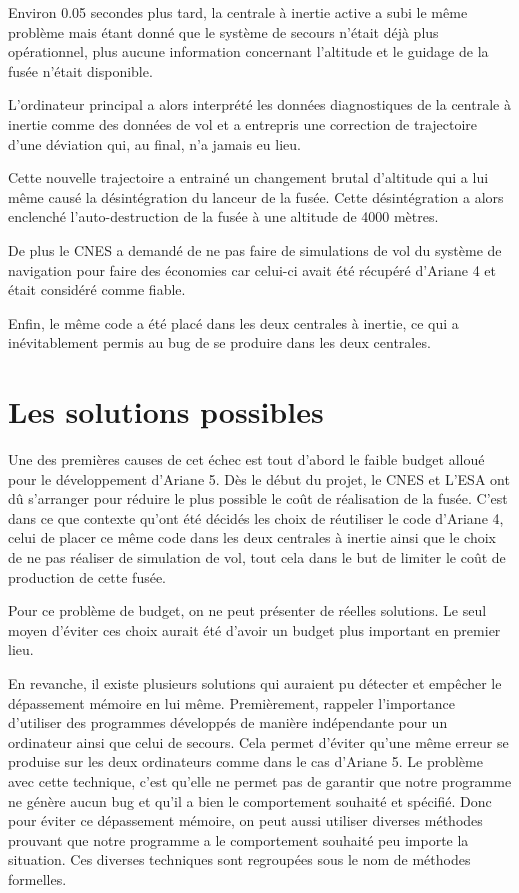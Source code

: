 \documentclass[12pt]{report}
\begin{document}
Environ 0.05 secondes plus tard, la centrale à inertie active a subi le même problème mais étant donné que le système de secours n'était déjà plus opérationnel, plus aucune information concernant l'altitude et le guidage de la fusée n'était disponible.   

L'ordinateur principal a alors interprété les données diagnostiques de la centrale à inertie comme des données de vol et a entrepris une correction de trajectoire d'une déviation qui, au final, n'a jamais eu lieu.
  
Cette nouvelle trajectoire a entrainé un changement brutal d'altitude qui a lui même causé la désintégration du lanceur de la fusée. Cette désintégration a alors enclenché l'auto-destruction de la fusée à une altitude de 4000 mètres.

De plus le \gls{CNES} a demandé de ne pas faire de simulations de vol du système de navigation pour faire des économies car celui-ci avait été récupéré d'Ariane 4 et était considéré comme fiable.

Enfin, le même code a été placé dans les deux centrales à inertie, ce qui a inévitablement permis au bug de se produire dans les deux centrales. 

\section{Les solutions possibles}
Une des premières causes de cet échec est tout d'abord le faible budget alloué pour le développement d'Ariane 5.
Dès le début du projet, le CNES et L'\gls{ESA} ont dû s'arranger pour réduire le plus possible le coût de réalisation de la fusée. C'est dans ce que contexte qu'ont été décidés les choix de réutiliser le code d'Ariane 4, celui de placer ce même code dans les deux centrales à inertie ainsi que le choix de ne pas réaliser de simulation de vol, tout cela dans le but de limiter le coût de production de cette fusée.

Pour ce problème de budget, on ne peut présenter de réelles solutions. Le seul moyen d'éviter ces choix aurait été d'avoir un budget plus important en premier lieu.

En revanche, il existe plusieurs solutions qui auraient pu détecter et empêcher le dépassement mémoire en lui même. Premièrement, rappeler l'importance d'utiliser des programmes développés de manière indépendante pour un ordinateur ainsi que celui de secours. Cela permet d'éviter qu'une même erreur se produise sur les deux ordinateurs comme dans le cas d'Ariane 5. Le problème avec cette technique, c'est qu'elle ne permet pas de garantir que notre programme ne génère aucun bug et qu'il a bien le comportement souhaité et spécifié. Donc pour éviter ce dépassement mémoire, on peut aussi utiliser diverses méthodes prouvant que notre programme a le comportement souhaité peu importe la situation. Ces diverses techniques sont regroupées sous le nom de méthodes formelles. 
\end{document}
